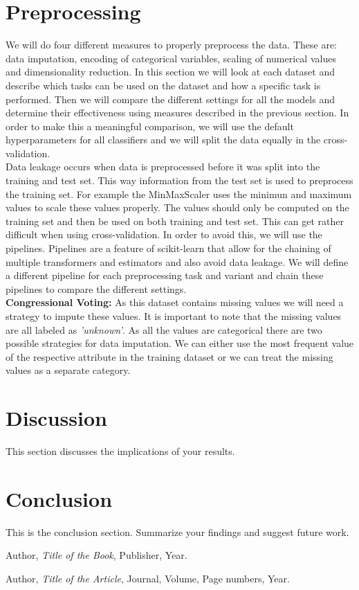 \documentclass[a4paper,12pt]{article}
\begin{document}
\section{Preprocessing}
We will do four different measures to properly preprocess the data. These are: data imputation, encoding of categorical variables,
scaling of numerical values and dimensionality reduction. In this section we will look at each dataset and 
describe which tasks can be used on the dataset and how a specific task is performed. Then we will compare the different
settings for all the models and determine their effectiveness using measures described in the previous section. 
In order to make this a meaningful comparison, we will use the default hyperparameters for all classifiers and 
we will split the data equally in the cross-validation.\\
Data leakage occurs when data is preprocessed before it was split into the training and test set. This way information 
from the test set is used to preprocess the training set. For example the MinMaxScaler uses the minimun and maximum values 
to scale these values properly. The values should only be computed on the training set and then be used on both training and 
test set. This can get rather difficult when using cross-validation. In order to avoid this, we will use the pipelines.    
Pipelines are a feature of scikit-learn that allow for the chaining of multiple transformers and estimators and also avoid 
data leakage. We will define a different pipeline for each preprocessing task and variant and chain these pipelines to compare 
the different settings.\\
\textbf{Congressional Voting:} As this dataset contains missing values we will need a strategy to impute these values. 
It is important to note that the missing values are all labeled as \textit{'unknown'}.
As all the values are categorical there are two possible strategies for data imputation.
We can either use the most frequent value of the respective attribute in the training dataset 
or we can treat the missing values as a separate category.



\section{Discussion}
This section discusses the implications of your results.

\section{Conclusion}
This is the conclusion section. Summarize your findings and suggest future work.

\begin{thebibliography}{9}
Author, \textit{Title of the Book}, Publisher, Year.

Author, \textit{Title of the Article}, Journal, Volume, Page numbers, Year.
\end{thebibliography}
\end{document}
